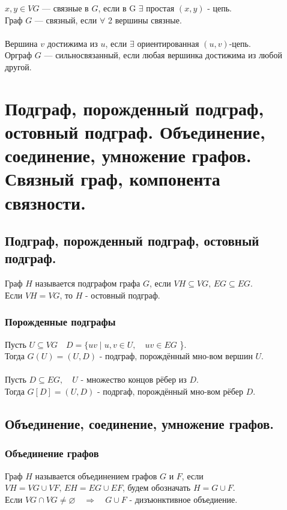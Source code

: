 \documentclass[12pt]{article}
\begin{document}
	$x,y \in VG$ — связные в $G$, если в G $\exists$ простая $(x,y)$ - цепь.\\
	Граф $G$ — связный, если $\forall$ 2 вершины связные.\\\\

	Вершина $v$ достижима из $u$, если $\exists$ ориентированная $(u,v)$-цепь.\\
	Орграф $G$ — сильносвязанный, если любая вершинка достижима из любой другой.\\

\section{Подграф, порожденный подграф, остовный подграф. Объединение, соединение, умножение графов. Связный граф, компонента связности.}
\subsection{Подграф, порожденный подграф, остовный подграф.}
	Граф $H$ называется подграфом графа $G$, если $VH \subseteq VG, \, EG \subseteq EG$.\\
	Если $VH = VG$, то $H$ - остовный подграф.
	\subsubsection{Порожденные подграфы}
		Пусть $U \subseteq VG \quad D=\{ uv \mid u,v \in U, \quad uv \in EG$ \}.\\
		Тогда $G(U) = (U, D)$ - подграф, порождённый мно-вом вершин $U$.\\\\
		Пусть $D \subseteq EG, \quad U$ - множество концов рёбер из $D$.\\
		Тогда $G[D] = (U,D)$ - подргаф, порождённый мно-вом рёбер $D$.

\subsection{Объединение, соединение, умножение графов.}
\subsubsection{Объединение графов}
	Граф $H$ называется объединением графов $G$ и $F$, если $VH = VG \cup VF, \, EH = EG \cup EF$, будем обозначать $H=G \cup F$.\\
	Если $VG \cap VG \ne \varnothing  \quad \Rightarrow  \quad G \cup F$ - дизъюнктивное объедиение.
\end{document}
